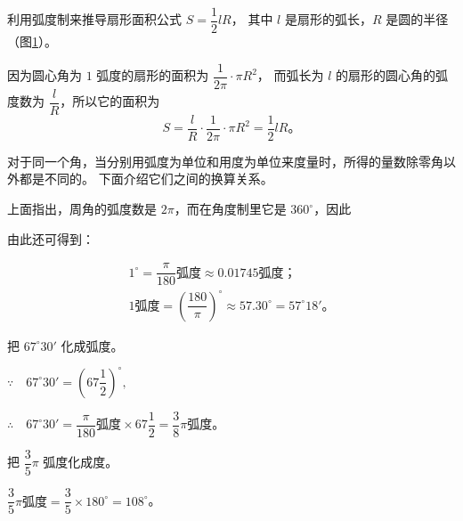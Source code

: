 \liti 利用弧度制来推导扇形面积公式 $S = \dfrac 1 2 l R$，
其中 $l$ 是扇形的弧长，$R$ 是圆的半径（图\ref{fig:2-8}）。

\begin{figure}[htbp]
    \centering
    
    \caption{}\label{fig:2-8}
\end{figure}

\jie 因为圆心角为 $1$ 弧度的扇形的面积为 $\dfrac{1}{2\pi} \cdot \pi R^2$，
而弧长为 $l$ 的扇形的圆心角的弧度数为 $\dfrac l R$，所以它的面积为
$$S = \dfrac l R \cdot \dfrac{1}{2\pi} \cdot \pi R^2 = \dfrac 1 2 l R \text{。}$$

对于同一个角，当分别用弧度为单位和用度为单位来度量时，所得的量数除零角以外都是不同的。
下面介绍它们之间的换算关系。

上面指出，周角的弧度数是 $2\pi$，而在角度制里它是 $360^\circ$，因此

\begin{center}
\end{center}

由此还可得到：

\begin{gather*}
    1^\circ = \dfrac{\pi}{180} \text{弧度} \approx 0.01745 \text{弧度；} \\
    1 \text{弧度} = \left( \dfrac{180}{\pi} \right)^\circ \approx 57.30^\circ = 57^\circ 18' \text{。}
\end{gather*}

\liti 把 $67^\circ 30'$ 化成弧度。

\vspace{0.5em}
\jie $\because \quad 67^\circ 30' = \left( 67 \dfrac 1 2 \right)^\circ ,$
\vspace{0.5em}

$\therefore \quad  67^\circ 30' = \dfrac{\pi}{180} \text{弧度} \times 67 \dfrac 1 2 = \dfrac 3 8 \pi \text{弧度。}$

\vspace{0.5em}
\liti 把 $\dfrac 3 5 \pi$ 弧度化成度。
\vspace{0.5em}

\jie $\dfrac 3 5 \pi \text{弧度} = \dfrac 3 5 \times 180^\circ = 108^\circ$。
\vspace{0.5em}

